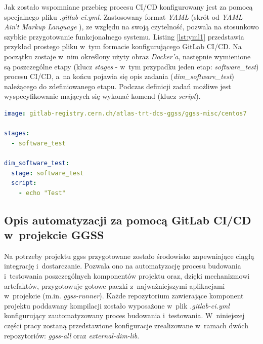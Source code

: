 Jak zostało wspomniane przebieg procesu CI/CD konfigurowany jest za pomocą specjalnego pliku \textit{.gitlab-ci.yml}. Zastosowany format \textit{YAML} (skrót od \textit{YAML Ain't Markup Language} \cite{YAMLWiki}), ze względu na swoją czytelność, pozwala na stosunkowo szybkie przygotowanie funkcjonalnego systemu. Listing \ref{lst:yml1} przedstawia przykład prostego pliku w~tym formacie konfigurującego GitLab CI/CD. Na początku zostaje w~nim określony użyty obraz \textit{Docker'a}, następnie wymienione są poszczególne etapy (klucz \textit{stages} - w~tym przypadku jeden etap: \textit{software\_test}) procesu CI/CD, a~na końcu pojawia się opis zadania (\textit{dim\_software\_test}) należącego do zdefiniowanego etapu. Podczas definicji zadań możliwe jest wyspecyfikowanie mających się wykonać komend (klucz \textit{script}).

\begin{lstlisting}[language=yaml, caption={Przykład prostego pliku \textit{.gitlab-ci.yml} generującego jeden etap procesu CI/CD oraz jedno zadanie w~ramach tego etapu}, label={lst:yml1}]
image: gitlab-registry.cern.ch/atlas-trt-dcs-ggss/ggss-misc/centos7

stages:
  - software_test

dim_software_test:
  stage: software_test
  script:
    - echo "Test"

\end{lstlisting}

\subsection{Opis automatyzacji za pomocą GitLab CI/CD w~projekcie GGSS}
Na potrzeby projektu \gls*{ggss} przygotowane zostało środowisko zapewniające ciągłą integrację i~dostarczanie. Pozwala ono na automatyzację procesu budowania i~testowania poszczególnych komponentów projektu oraz, dzięki mechanizmowi artefaktów, przygotowuje gotowe paczki z~najważniejszymi aplikacjami w~projekcie (m.in. \textit{ggss-runner}). Każde repozytorium zawierające komponent projektu poddawany kompilacji zostało wyposażone w~plik \textit{.gitlab-ci.yml} konfigurujący zautomatyzowany proces budowania i~testowania. W~niniejszej części pracy zostaną przedstawione konfiguracje zrealizowane w~ramach dwóch repozytoriów: \textit{ggss-all} oraz \textit{external-dim-lib}. 

